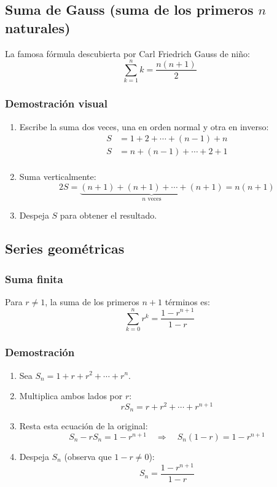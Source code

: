 \documentclass[letterpaper, 12pt]{article}
\begin{document}
	\subsection{Suma de Gauss (suma de los primeros $n$ naturales)}
	
	La famosa fórmula descubierta por Carl Friedrich Gauss de niño:
	\[
	\sum_{k=1}^n k = \frac{n(n+1)}{2}
	\]
	
	\subsubsection{Demostración visual}
	
	\begin{enumerate}
		\item Escribe la suma dos veces, una en orden normal y otra en inverso:
		\[
		\begin{aligned}
			S &= 1 + 2 + \cdots + (n-1) + n \\
			S &= n + (n-1) + \cdots + 2 + 1 \\
		\end{aligned}
		\]
		
		\item Suma verticalmente:
		\[
		2S = \underbrace{(n+1) + (n+1) + \cdots + (n+1)}_{n \text{ veces}} = n(n+1)
		\]
		
		\item Despeja $S$ para obtener el resultado.
	\end{enumerate}
	
	\subsection{Series geométricas}
	
	\subsubsection{Suma finita}
	
	Para $r \neq 1$, la suma de los primeros $n+1$ términos es:
	\[
	\sum_{k=0}^n r^k = \frac{1 - r^{n+1}}{1 - r}
	\]
	
	\subsubsection{Demostración}
	
	\begin{enumerate}
		\item Sea $S_n = 1 + r + r^2 + \cdots + r^n$.
		
		\item Multiplica ambos lados por $r$:
		\[
		rS_n = r + r^2 + \cdots + r^{n+1}
		\]
		
		\item Resta esta ecuación de la original:
		\[
		S_n - rS_n = 1 - r^{n+1} \quad \Rightarrow \quad S_n(1 - r) = 1 - r^{n+1}
		\]
		
		\item Despeja $S_n$ (observa que $1-r \neq 0$):
		\[
		S_n = \frac{1 - r^{n+1}}{1 - r}
		\]
	\end{enumerate}
	
\end{document}

